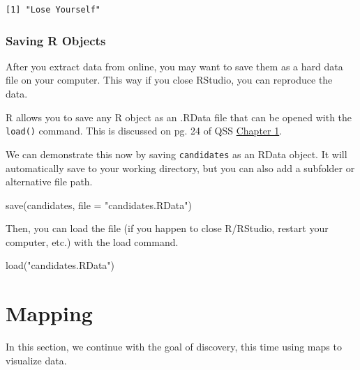 \documentclass[
  letterpaper,
  DIV=11,
  numbers=noendperiod]{scrreprt}
\newenvironment{Shaded}{\begin{snugshade}}{\end{snugshade}}
\newcommand{\AttributeTok}[1]{\textcolor[rgb]{0.40,0.45,0.13}{#1}}
\newcommand{\FunctionTok}[1]{\textcolor[rgb]{0.28,0.35,0.67}{#1}}
\newcommand{\NormalTok}[1]{\textcolor[rgb]{0.00,0.23,0.31}{#1}}
\newcommand{\StringTok}[1]{\textcolor[rgb]{0.13,0.47,0.30}{#1}}
\begin{document}
\begin{verbatim}
[1] "Lose Yourself"
\end{verbatim}

\hypertarget{saving-r-objects}{%
\subsection{Saving R Objects}\label{saving-r-objects}}

After you extract data from online, you may want to save them as a hard
data file on your computer. This way if you close RStudio, you can
reproduce the data.

R allows you to save any R object as an .RData file that can be opened
with the \texttt{load()} command. This is discussed on pg. 24 of QSS
\href{https://assets.press.princeton.edu/chapters/s11025.pdf}{Chapter
1}.

We can demonstrate this now by saving \texttt{candidates} as an RData
object. It will automatically save to your working directory, but you
can also add a subfolder or alternative file path.

\begin{Shaded}
\begin{Highlighting}[]
\FunctionTok{save}\NormalTok{(candidates, }\AttributeTok{file =} \StringTok{"candidates.RData"}\NormalTok{)}
\end{Highlighting}
\end{Shaded}

Then, you can load the file (if you happen to close R/RStudio, restart
your computer, etc.) with the load command.

\begin{Shaded}
\begin{Highlighting}[]
\FunctionTok{load}\NormalTok{(}\StringTok{"candidates.RData"}\NormalTok{)}
\end{Highlighting}
\end{Shaded}


\hypertarget{maps}{%
\chapter{Mapping}\label{maps}}

In this section, we continue with the goal of discovery, this time using
maps to visualize data.
\end{document}
